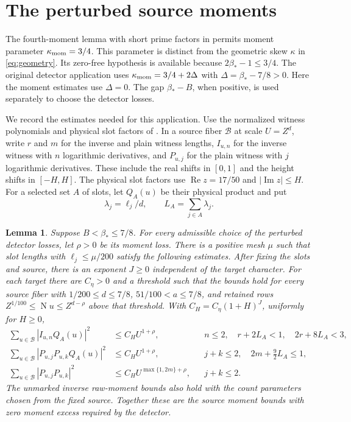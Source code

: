 \documentclass[11pt]{article}
\newtheorem{lemma}[theorem]{Lemma}
\newcommand{\Ree}{\operatorname{Re}}
\newcommand{\NF}{\operatorname{N}}
\begin{document}
\section{The perturbed source moments}\label{sec:moments}

The fourth-moment lemma with short prime factors in \cite{OAI} permits
moment parameter $\kappa_{\rm mom}=3/4$.
This parameter is distinct from the geometric skew $\kappa$ in
\eqref{eq:geometry}.
Its zero-free hypothesis is available because
$2\beta_*-1\le3/4$. The original detector application uses
$\kappa_{\rm mom}=3/4+2\Delta$ with $\Delta=\beta_*-7/8>0$.
Here the moment estimates use $\Delta=0$. The gap $\beta_*-B$, when
positive, is used separately to choose the detector losses.

We record the estimates needed for this application. Use the normalized
witness polynomials and physical slot factors of \cite{OAI}. In a source
fiber $\mathcal B$ at scale $U=Z^d$, write $r$ and $m$ for the inverse and
plain witness lengths, $I_{u,n}$ for the inverse witness with $n$
logarithmic derivatives, and $P_{u,j}$ for the plain witness with $j$
logarithmic derivatives. These include the real shifts in $[0,1]$ and
the height shifts in $[-H,H]$. The physical slot factors use
$\Ree z=17/50$ and $|\operatorname{Im}z|\le H$.
For a selected set $A$ of slots, let
$Q_A(u)$ be their physical product and put
\[
 \lambda_j=\ell_j/d,\qquad L_A=\sum_{j\in A}\lambda_j.
\]

\begin{lemma}\label{lem:moments}
Suppose $B<\beta_*\le7/8$. For every admissible choice of the perturbed
detector losses, let $\rho>0$ be its moment loss. There is a positive mesh
$\mu$ such that slot lengths with $\ell_j\le\mu/200$ satisfy the following
estimates. After fixing the slots and source, there is an exponent
$J\ge0$ independent of the target character. For each target there are
$C_\eta>0$ and a threshold such that the bounds hold for every source fiber with
$1/200\le d\le7/8$, $51/100<a\le7/8$, and retained rows
$Z^{1/100}\le\NF u\le Z^{d-\rho}$ above that threshold.
With $C_H=C_\eta(1+H)^J$, uniformly for $H\ge0$,
\begin{align}
 \sum_{u\in\mathcal B}|I_{u,n}Q_A(u)|^2
   &\le C_H U^{1+\rho},
   && n\le2,\quad r+2L_A<1,\quad 2r+8L_A<3,
   \label{eq:inverse-moment}\\
 \sum_{u\in\mathcal B}|P_{u,j}P_{u,k}Q_A(u)|^2
   &\le C_H U^{1+\rho},
   && j+k\le2,\quad 2m+\tfrac92 L_A\le1,
   \label{eq:plain-marked-moment}\\
 \sum_{u\in\mathcal B}|P_{u,j}P_{u,k}|^2
   &\le C_H U^{\max\{1,2m\}+\rho},
   && j+k\le2.
   \label{eq:plain-unmarked-moment}
\end{align}
The unmarked inverse raw-moment bounds also hold with the count parameters
chosen from the fixed source. Together these are the source moment bounds
with zero moment excess required by the detector.
\end{lemma}
\end{document}
